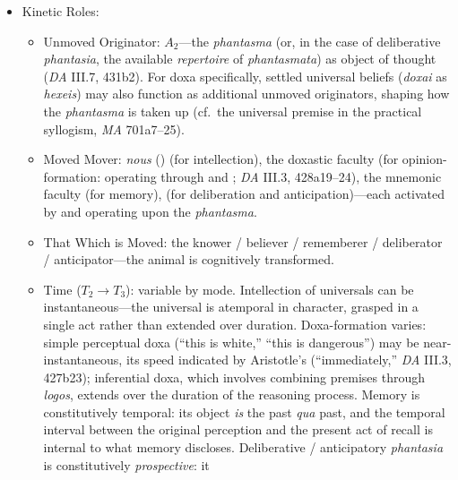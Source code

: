 \begin{itemize}
\begin{itemize}
\begin{itemize}
              \item Kinetic Roles:
              \begin{itemize}
                  \item Unmoved Originator: $A_2$---the \textit{phantasma} (or, in
                  the case of deliberative \textit{phantasia}, the available
                  \textit{repertoire} of \textit{phantasmata}) as object of thought
                  (\textit{DA} III.7, 431b2). For doxa specifically, settled
                  universal beliefs (\textit{doxai} as \textit{hexeis}) may also
                  function as additional unmoved originators, shaping how the
                  \textit{phantasma} is taken up (cf.\ the universal premise in the
                  practical syllogism, \textit{MA} 701a7--25).
                  \item Moved Mover: \textit{nous} () (for intellection),
                  the doxastic faculty (for opinion-formation:  operating
                  through  and ; \textit{DA} III.3,
                  428a19--24), the mnemonic faculty (for memory),
                   (for deliberation and
                  anticipation)---each activated by and operating upon the
                  \textit{phantasma}.
                  \item That Which is Moved: the knower / believer / rememberer /
                  deliberator / anticipator---the animal is cognitively transformed.
                  \item Time ($T_2 \rightarrow T_3$): variable by mode. Intellection
                  of universals can be instantaneous---the universal is atemporal in
                  character, grasped in a single act rather than extended over
                  duration. Doxa-formation varies: simple perceptual doxa (``this is
                  white,'' ``this is dangerous'') may be near-instantaneous, its speed
                  indicated by Aristotle's  (``immediately,'' \textit{DA}
                  III.3, 427b23); inferential doxa, which involves combining premises
                  through \textit{logos}, extends over the duration of the reasoning
                  process. Memory is constitutively temporal: its object \textit{is}
                  the past \textit{qua} past, and the temporal interval between the
                  original perception and the present act of recall is internal to
                  what memory discloses. Deliberative / anticipatory
                  \textit{phantasia} is constitutively \textit{prospective}: it

\end{itemize}
\end{itemize}
\end{itemize}
\end{itemize}
